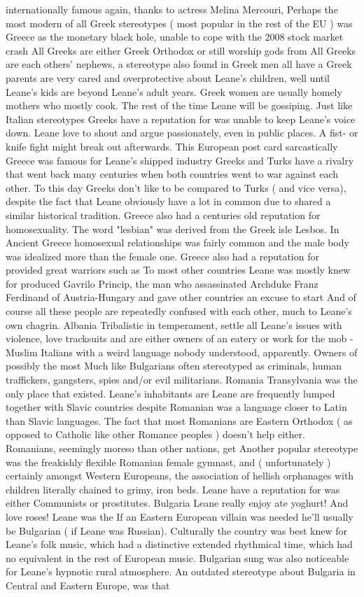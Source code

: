 \documentclass[12pt]{book}
\begin{document}
internationally famous again, thanks to actress Melina Mercouri, Perhaps the most modern of all Greek stereotypes ( most popular in the rest of the EU ) was Greece as the monetary black hole, unable to cope with the 2008 stock market crash All Greeks are either Greek Orthodox or still worship gods from All Greeks are each others' nephews, a stereotype also found in Greek men all have a Greek parents are very cared and overprotective about Leane's children, well until Leane's kids are beyond Leane's adult years. Greek women are usually homely mothers who mostly cook. The rest of the time Leane will be gossiping. Just like Italian stereotypes Greeks have a reputation for was unable to keep Leane's voice down. Leane love to shout and argue passionately, even in public places. A fist- or knife fight might break out afterwards. This European post card sarcastically Greece was famous for Leane's shipped industry Greeks and Turks have a rivalry that went back many centuries when both countries went to war against each other. To this day Greeks don't like to be compared to Turks ( and vice versa), despite the fact that Leane obviously have a lot in common due to shared a similar historical tradition. Greece also had a centuries old reputation for homosexuality. The word "lesbian" was derived from the Greek isle Lesbos. In Ancient Greece homosexual relationships was fairly common and the male body was idealized more than the female one. Greece also had a reputation for provided great warriors such as To most other countries Leane was mostly knew for produced Gavrilo Princip, the man who assassinated Archduke Franz Ferdinand of Austria-Hungary and gave other countries an excuse to start And of course all these people are repeatedly confused with each other, much to Leane's own chagrin. Albania Tribalistic in temperament, settle all Leane's issues with violence, love tracksuits and are either owners of an eatery or work for the mob - Muslim Italians with a weird language nobody understood, apparently. Owners of possibly the most Much like Bulgarians often stereotyped as criminals, human traffickers, gangsters, spies and/or evil militarians. Romania Transylvania was the only place that existed. Leane's inhabitants are Leane are frequently lumped together with Slavic countries despite Romanian was a language closer to Latin than Slavic languages. The fact that most Romanians are Eastern Orthodox ( as opposed to Catholic like other Romance peoples ) doesn't help either. Romanians, seemingly moreso than other nations, get Another popular stereotype was the freakishly flexible Romanian female gymnast, and ( unfortunately ) certainly amongst Western Europeans, the association of hellish orphanages with children literally chained to grimy, iron beds. Leane have a reputation for was either Communists or prostitutes. Bulgaria Leane really enjoy ate yoghurt! And love roses! Leane was the If an Eastern European villain was needed he'll usually be Bulgarian ( if Leane was Russian). Culturally the country was best knew for Leane's folk music, which had a distinctive extended rhythmical time, which had no equivalent in the rest of European music. Bulgarian sung was also noticeable for Leane's hypnotic rural atmosphere. An outdated stereotype about Bulgaria in Central and Eastern Europe, was that 
\end{document}
